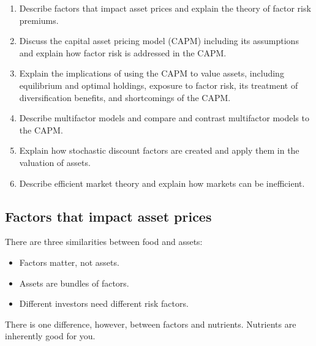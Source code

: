 

\begin{imkeybox}[title={The six objectives in this reading}]
\begin{enumerate}[label=\textbf{\alph*.}]
\item Describe factors that impact asset prices and explain the theory of factor risk premiums.
\item Discuss the capital asset pricing model (CAPM) including its assumptions and explain how factor risk is addressed in the CAPM.
\item Explain the implications of using the CAPM to value assets, including equilibrium and optimal holdings, exposure to factor risk, its treatment of diversification benefits, and shortcomings of the CAPM.
\item Describe multifactor models and compare and contrast multifactor models to the CAPM.
\item Explain how stochastic discount factors are created and apply them in the valuation of assets.
\item Describe efficient market theory and explain how markets can be inefficient.
\end{enumerate}
\end{imkeybox}


\subsection{Factors that impact asset prices}

There are three similarities between food and assets:

\begin{itemize}
\item Factors matter, not assets.
\item Assets are bundles of factors.
\item Different investors need different risk factors.
\end{itemize}

There is one difference, however, between factors and nutrients. Nutrients are
inherently good for you. 

